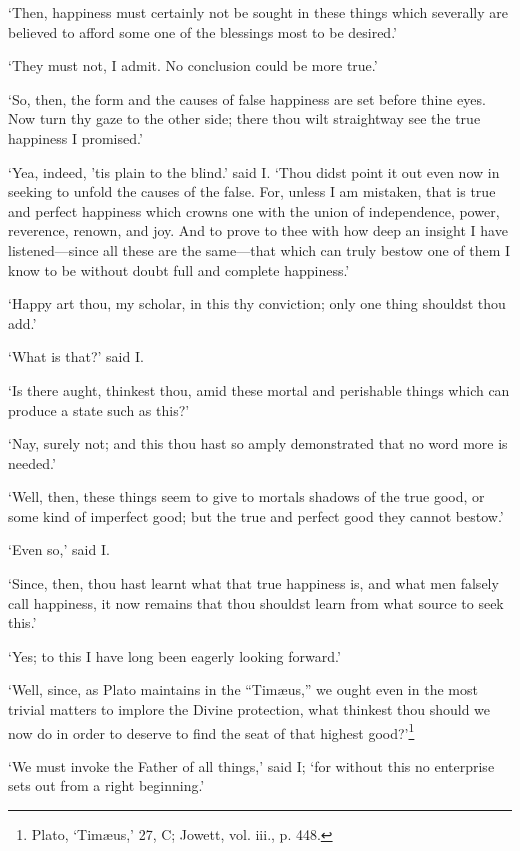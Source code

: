 \documentclass[11pt]{book}
\begin{document}
`Then, happiness must certainly not be sought in \linebreak these things which
severally are believed to afford some one of the blessings most to be
desired.'

`They must not, I admit. No conclusion could be more true.'

`So, then, the form and the causes of false happiness are set before
thine eyes. Now turn thy gaze to the other side; there thou wilt
straightway see the true happiness I promised.'

`Yea, indeed, 'tis plain to the blind.' said I. `Thou didst point it out
even now in seeking to unfold the causes of the false. For, unless I am
mistaken, that is true and perfect happiness which crowns one with the
union of independence, power, reverence, renown, and joy. And to prove
to thee with how deep an insight I have listened---since all these are
the same---that which can truly bestow one of them I know to be without
doubt full and complete happiness.'

`Happy art thou, my scholar, in this thy conviction; only one thing
shouldst thou add.'

`What is that?' said I.

`Is there aught, thinkest thou, amid these mortal and perishable things
which can produce a state such as this?'

`Nay, surely not; and this thou hast so amply demonstrated that no word
more is needed.'

`Well, then, these things seem to give to mortals shadows of the true
good, or some kind of imperfect good; but the true and perfect good they
cannot bestow.'

`Even so,' said I.

`Since, then, thou hast learnt what that true happiness is, and what men
falsely call happiness, it now remains that thou shouldst learn from
what source to seek this.'

`Yes; to this I have long been eagerly looking forward.'

`Well, since, as Plato maintains in the ``Timæus,'' we ought even in the
most trivial matters to implore the Divine protection, what thinkest
thou should we now do in order to deserve to find the seat of that
highest good?'\footnote{Plato, `Timæus,’ 27, C; Jowett, vol. iii., p. 448.}

`We must invoke the Father of all things,' said I; `for without this no
enterprise sets out from a right beginning.'
\end{document}
